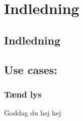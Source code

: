 \chapter{Indledning}
\section{Indledning}
\section{Use cases:}
\subsection{Tænd lys}


Goddag du hej hej 